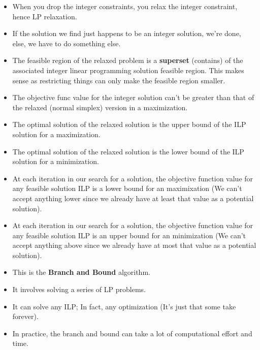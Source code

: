 \documentclass[12pt, a4paper]{article}
\begin{document}
\begin{itemize}
    \item When you drop the integer constraints, you relax the integer constraint, hence LP relaxation.
    \item If the solution we find just happens to be an integer solution, we're done, else, we have to do something else.
    \item The feasible region of the relaxed problem is a \textbf{superset} (contains) of the associated integer linear programming solution feasible region. This makes sense as restricting things can only make the feasible region smaller.
    \item The objective func value for the integer solution can't be greater than that of the relaxed (normal simplex) version in a maximization.
    \item The optimal solution of the relaxed solution is the upper bound of the ILP solution for a maximization.
    \item The optimal solution of the relaxed solution is the lower bound of the ILP solution for a minimization.
    \item At each iteration in our search for a solution, the objective function value for any feasible solution ILP is a lower bound for an maximixation (We can't accept anything lower since we already have at least that value as a potential solution).
    \item At each iteration in our search for a solution, the objective function value for any feasible solution ILP is an upper bound for an minimization (We can't accept anything above since we already have at most that value as a potential solution).
    \item This is the \textbf{Branch and Bound} algorithm.
    \item It involves solving a series of LP problems.
    \item It can solve any ILP; In fact, any optimization (It's just that some take forever).
    \item In practice, the branch and bound can take a lot of computational effort and time.
\end{itemize}
\end{document}
